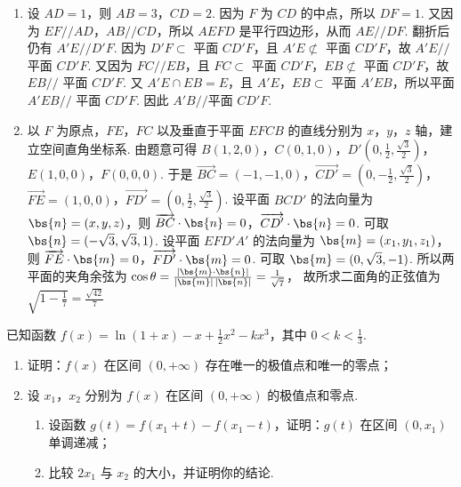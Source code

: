 \documentclass[UTF8,a4paper,oneside,11pt]{ctexbook}
\begin{document}
\begin{solution}
\begin{enumerate}
\item 设 \(AD=1\)，则 \(AB=3\)，\(CD=2\). 因为 \(F\) 为 \(CD\) 的中点，所以 \(DF=1\). 又因为 \(EF//AD\)，\(AB//CD\)，所以 \(AEFD\) 是平行四边形，从而 \(AE//DF\). 翻折后仍有 \(A'E//D'F\).
因为 \(D'F\subset\) 平面 \(CD'F\)，且 \(A'E\not\subset\) 平面 \(CD'F\)，故 \(A'E//\) 平面 \(CD'F\). 又因为 \(FC//EB\)，且 \(FC\subset\) 平面 \(CD'F\)，\(EB\not\subset\) 平面 \(CD'F\)，故 \(EB//\) 平面 \(CD'F\).
又 \(A'E\cap EB=E\)，且 \(A'E\)，\(EB\subset\) 平面 \(A'EB\)，所以平面 \(A'EB//\) 平面 \(CD'F\). 因此
\(A'B//\text{平面 }CD'F\).

\item 以 \(F\) 为原点，\(FE\)，\(FC\) 以及垂直于平面 \(EFCB\) 的直线分别为 \(x\)，\(y\)，\(z\) 轴，建立空间直角坐标系.
由题意可得
\(B(1,2,0)\)，\(C(0,1,0)\)，\(D'\left(0,\frac12,\frac{\sqrt3}{2}\right)\)，\(E(1,0,0)\)，\(F(0,0,0)\).
于是 \(\overrightarrow{BC}=(-1,-1,0)\)，\(\overrightarrow{CD'}=\left(0,-\frac12,\frac{\sqrt3}{2}\right)\)，\(\overrightarrow{FE}=(1,0,0)\)，\(\overrightarrow{FD'}=\left(0,\frac12,\frac{\sqrt3}{2}\right)\).
设平面 \(BCD'\) 的法向量为 \(\bs{n}=(x,y,z)\)，则 \(\overrightarrow{BC}\cdot \bs{n}=0\)，\(\overrightarrow{CD'}\cdot \bs{n}=0\).
可取
\(\bs{n}=(-\sqrt3,\sqrt3,1)\).
设平面 \(EFD'A'\) 的法向量为 \(\bs{m}=(x_1,y_1,z_1)\)，则 \(\overrightarrow{FE}\cdot \bs{m}=0\)，\(\overrightarrow{FD'}\cdot \bs{m}=0\).
可取
\(\bs{m}=(0,\sqrt3,-1)\).
所以两平面的夹角余弦为
\(
\cos\theta=\frac{|\bs{m}\cdot \bs{n}|}{|\bs{m}|\,|\bs{n}|}=\frac{1}{\sqrt7}
\)，
故所求二面角的正弦值为
\(
\sqrt{1-\frac17}=\frac{\sqrt{42}}{7}
\)
\end{enumerate}
\end{solution}

\begin{problem}
已知函数 \(f(x)=\ln(1+x)-x+\frac12x^2-kx^3\)，其中 \(0<k<\frac13\).
\begin{enumerate}
\item 证明：\(f(x)\) 在区间 \((0,+\infty)\) 存在唯一的极值点和唯一的零点；
\item 设 \(x_1\)，\(x_2\) 分别为 \(f(x)\) 在区间 \((0,+\infty)\) 的极值点和零点.
    \begin{enumerate}
    \item 设函数 \(g(t)=f(x_1+t)-f(x_1-t)\)，证明：\(g(t)\) 在区间 \((0,x_1)\) 单调递减；
    \item 比较 \(2x_1\) 与 \(x_2\) 的大小，并证明你的结论.
    \end{enumerate}
\end{enumerate}
\end{problem}
\end{document}
